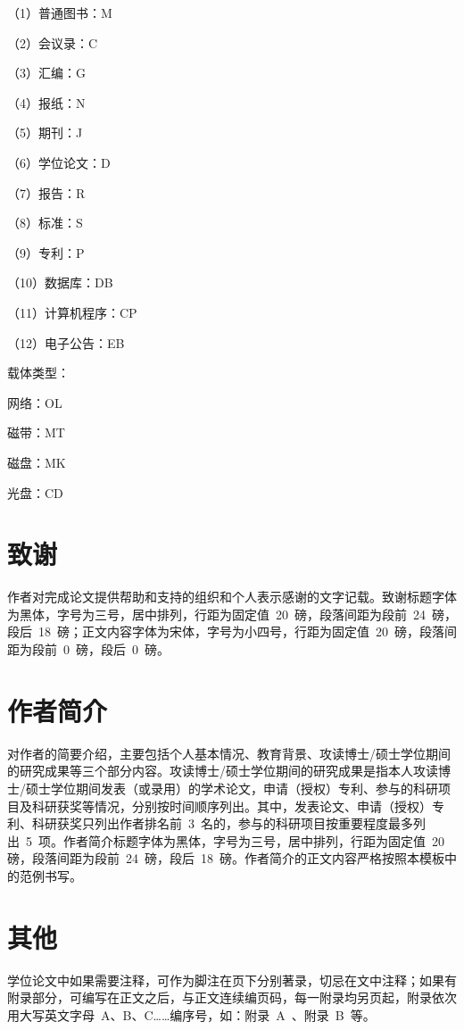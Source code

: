 （1）普通图书：M     \par
（2）会议录：C       \par
（3）汇编：G         \par
（4）报纸：N         \par
（5）期刊：J         \par
（6）学位论文：D     \par
（7）报告：R         \par
（8）标准：S         \par
（9）专利：P         \par
（10）数据库：DB     \par
（11）计算机程序：CP \par
（12）电子公告：EB   \par
载体类型：           \par
网络：OL             \par
磁带：MT             \par
磁盘：MK             \par
光盘：CD

\section{致谢}

作者对完成论文提供帮助和支持的组织和个人表示感谢的文字记载。致谢标题字体为黑体，字号为三号，居中排列，行距为固定值~20~磅，段落间距为段前~24~磅，段后~18~磅；正文内容字体为宋体，字号为小四号，行距为固定值~20~磅，段落间距为段前~0~磅，段后~0~磅。

\section{作者简介}

对作者的简要介绍，主要包括个人基本情况、教育背景、攻读博士/硕士学位期间的研究成果等三个部分内容。攻读博士/硕士学位期间的研究成果是指本人攻读博士/硕士学位期间发表（或录用）的学术论文，申请（授权）专利、参与的科研项目及科研获奖等情况，分别按时间顺序列出。其中，发表论文、申请（授权）专利、科研获奖只列出作者排名前~3~名的，参与的科研项目按重要程度最多列出~5~项。作者简介标题字体为黑体，字号为三号，居中排列，行距为固定值~20~ 磅，段落间距为段前~24~磅，段后~18~磅。作者简介的正文内容严格按照本模板中的范例书写。

\section{其他}

学位论文中如果需要注释，可作为脚注在页下分别著录，切忌在文中注释；如果有附录部分，可编写在正文之后，与正文连续编页码，每一附录均另页起，附录依次用大写英文字母~A、B、C……编序号，如：附录~A~、附录~B~等。

